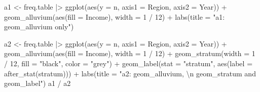 \documentclass[
  letterpaper,
  DIV=11,
  numbers=noendperiod]{scrreprt}
\newenvironment{Shaded}{\begin{snugshade}}{\end{snugshade}}
\newcommand{\AttributeTok}[1]{\textcolor[rgb]{0.40,0.45,0.13}{#1}}
\newcommand{\DecValTok}[1]{\textcolor[rgb]{0.68,0.00,0.00}{#1}}
\newcommand{\FunctionTok}[1]{\textcolor[rgb]{0.28,0.35,0.67}{#1}}
\newcommand{\NormalTok}[1]{\textcolor[rgb]{0.00,0.23,0.31}{#1}}
\newcommand{\OtherTok}[1]{\textcolor[rgb]{0.00,0.23,0.31}{#1}}
\newcommand{\SpecialCharTok}[1]{\textcolor[rgb]{0.37,0.37,0.37}{#1}}
\newcommand{\StringTok}[1]{\textcolor[rgb]{0.13,0.47,0.30}{#1}}
\begin{document}
\begin{Shaded}
\begin{Highlighting}[]
\NormalTok{a1 }\OtherTok{\textless{}{-}}\NormalTok{ freq.table }\SpecialCharTok{|\textgreater{}}
  \FunctionTok{ggplot}\NormalTok{(}\FunctionTok{aes}\NormalTok{(}\AttributeTok{y =}\NormalTok{ n, }\AttributeTok{axis1 =}\NormalTok{ Region, }\AttributeTok{axis2 =}\NormalTok{ Year)) }\SpecialCharTok{+}
  \FunctionTok{geom\_alluvium}\NormalTok{(}\FunctionTok{aes}\NormalTok{(}\AttributeTok{fill =}\NormalTok{ Income), }\AttributeTok{width =} \DecValTok{1} \SpecialCharTok{/} \DecValTok{12}\NormalTok{) }\SpecialCharTok{+}
  \FunctionTok{labs}\NormalTok{(}\AttributeTok{title =} \StringTok{"a1: geom\_alluvium only"}\NormalTok{)}

\NormalTok{a2 }\OtherTok{\textless{}{-}}\NormalTok{ freq.table }\SpecialCharTok{|\textgreater{}}
  \FunctionTok{ggplot}\NormalTok{(}\FunctionTok{aes}\NormalTok{(}\AttributeTok{y =}\NormalTok{ n, }\AttributeTok{axis1 =}\NormalTok{ Region, }\AttributeTok{axis2 =}\NormalTok{ Year)) }\SpecialCharTok{+}
  \FunctionTok{geom\_alluvium}\NormalTok{(}\FunctionTok{aes}\NormalTok{(}\AttributeTok{fill =}\NormalTok{ Income), }\AttributeTok{width =} \DecValTok{1} \SpecialCharTok{/} \DecValTok{12}\NormalTok{) }\SpecialCharTok{+}
  \FunctionTok{geom\_stratum}\NormalTok{(}\AttributeTok{width =} \DecValTok{1} \SpecialCharTok{/} \DecValTok{12}\NormalTok{, }\AttributeTok{fill =} \StringTok{"black"}\NormalTok{, }\AttributeTok{color =} \StringTok{"grey"}\NormalTok{) }\SpecialCharTok{+}
  \FunctionTok{geom\_label}\NormalTok{(}\AttributeTok{stat =} \StringTok{"stratum"}\NormalTok{, }\FunctionTok{aes}\NormalTok{(}\AttributeTok{label =} \FunctionTok{after\_stat}\NormalTok{(stratum))) }\SpecialCharTok{+}
  \FunctionTok{labs}\NormalTok{(}\AttributeTok{title =} \StringTok{"a2: geom\_alluvium, }\SpecialCharTok{\textbackslash{}n}\StringTok{ geom\_stratum and geom\_label"}\NormalTok{)}
\NormalTok{a1 }\SpecialCharTok{/}\NormalTok{ a2}
\end{Highlighting}
\end{Shaded}
\end{document}
